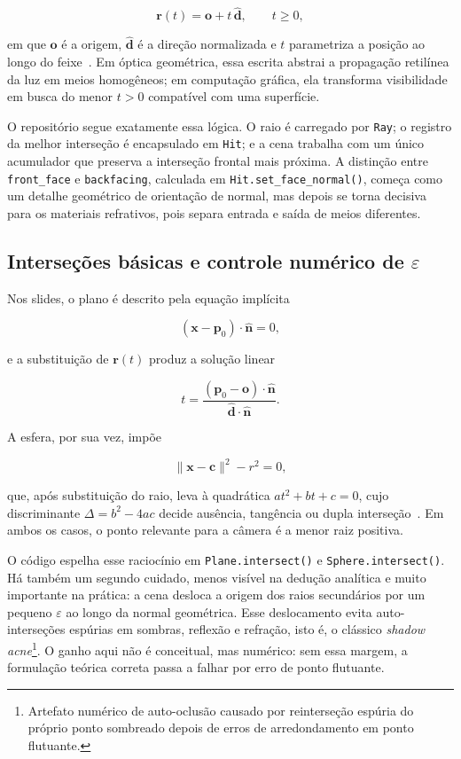 \documentclass[portuguese]{sbcreviews-2025}%
\makeatletter
\newcommand{\slideurl}[1]{%
    \ifcsname slideurl@#1\endcsname
        \csname slideurl@#1\endcsname
    \else
        #1
    \fi
}
\newcommand{\slidescite}[2]{\citep[\href{\slideurl{#1}}{pp.~#2}]{#1}}
\makeatother
\begin{document}
\[
\mathbf{r}(t)=\mathbf{o}+t\,\hat{\mathbf{d}},\qquad t\ge 0,
\]

em que \(\mathbf{o}\) é a origem, \(\hat{\mathbf{d}}\) é a direção normalizada e \(t\) parametriza a posição ao longo do feixe~\slidescite{inf2608slides04}{7--9}. Em óptica geométrica, essa escrita abstrai a propagação retilínea da luz em meios homogêneos; em computação gráfica, ela transforma visibilidade em busca do menor \(t>0\) compatível com uma superfície.

O repositório segue exatamente essa lógica. O raio é carregado por \texttt{Ray}; o registro da melhor interseção é encapsulado em \texttt{Hit}; e a cena trabalha com um único acumulador que preserva a interseção frontal mais próxima. A distinção entre \texttt{front\_face} e \texttt{backfacing}, calculada em \texttt{Hit.set\_face\_normal()}, começa como um detalhe geométrico de orientação de normal, mas depois se torna decisiva para os materiais refrativos, pois separa entrada e saída de meios diferentes.

\subsection{Interseções básicas e controle numérico de \texorpdfstring{$\varepsilon$}{epsilon}}
\label{sec:intersecoes-v3}

Nos slides, o plano é descrito pela equação implícita

\[
(\mathbf{x}-\mathbf{p}_0)\cdot\hat{\mathbf{n}}=0,
\]

e a substituição de \(\mathbf{r}(t)\) produz a solução linear

\[
t = \frac{(\mathbf{p}_0-\mathbf{o})\cdot\hat{\mathbf{n}}}{\hat{\mathbf{d}}\cdot\hat{\mathbf{n}}}.
\]

A esfera, por sua vez, impõe

\[
\lVert\mathbf{x}-\mathbf{c}\rVert^2-r^2=0,
\]

que, após substituição do raio, leva à quadrática \(at^2+bt+c=0\), cujo discriminante \(\Delta=b^2-4ac\) decide ausência, tangência ou dupla interseção~\slidescite{inf2608slides04}{10--18}. Em ambos os casos, o ponto relevante para a câmera é a menor raiz positiva.

O código espelha esse raciocínio em \texttt{Plane.intersect()} e \texttt{Sphere.intersect()}. Há também um segundo cuidado, menos visível na dedução analítica e muito importante na prática: a cena desloca a origem dos raios secundários por um pequeno \(\varepsilon\) ao longo da normal geométrica. Esse deslocamento evita auto-interseções espúrias em sombras, reflexão e refração, isto é, o clássico \emph{shadow acne}\footnote{Artefato numérico de auto-oclusão causado por reinterseção espúria do próprio ponto sombreado depois de erros de arredondamento em ponto flutuante.}. O ganho aqui não é conceitual, mas numérico: sem essa margem, a formulação teórica correta passa a falhar por erro de ponto flutuante.
\end{document}
